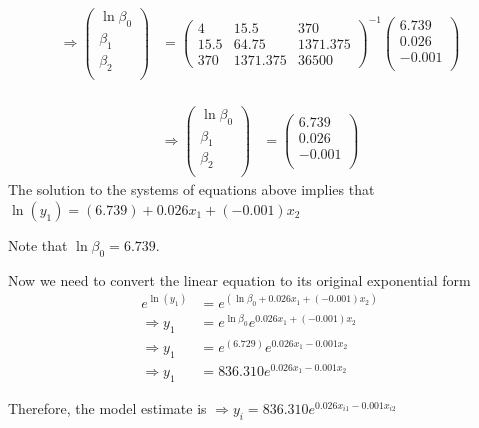 \documentclass[
]{article}
\begin{document}
\begin{align*}
  \Rightarrow
  \begin{pmatrix}
    \ln\beta_0\\
    \beta_1\\
    \beta_2\\
  \end{pmatrix}
  & =
  \begin{pmatrix}
    4 & 15.5 & 370 \\
    15.5 & 64.75 & 1371.375\\
    370 & 1371.375 & 36500
  \end{pmatrix}^{-1}
  
  \begin{pmatrix}
    6.739\\
    0.026\\
    -0.001\\
  \end{pmatrix} \\
\end{align*}

\begin{align*}
  \Rightarrow
    \begin{pmatrix}
      \ln\beta_0\\
      \beta_1\\
      \beta_2\\
    \end{pmatrix}
    & =
    \begin{pmatrix}
    6.739\\
    0.026\\
    -0.001\\
  \end{pmatrix}
\end{align*} The solution to the systems of equations above implies that
\(\ln(y_1) = (6.739) + 0.026x_1 + (-0.001)x_2\)

Note that \(\ln\beta_0 = 6.739\).

Now we need to convert the linear equation to its original exponential
form \begin{align*}
e^{\ln(y_1)} & = e^{(\ln\beta_0 + 0.026x_1 + (-0.001)x_2)} \\
\Rightarrow y_1 & = e^{\ln\beta_0} e^{0.026x_1 + (-0.001)x_2} \\
\Rightarrow y_1 & = e^{(6.729)} e^{0.026x_1 - 0.001x_2} \\
\Rightarrow y_1 & = 836.310 e^{0.026x_1 - 0.001x_2} 
\end{align*}

Therefore, the model estimate is
\(\Rightarrow y_i =  836.310 e^{0.026x_{i1} - 0.001x_{i2}}\)
\end{document}
